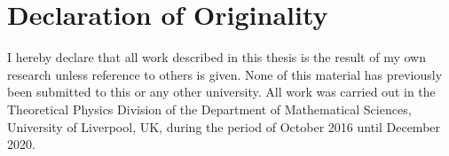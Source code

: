 
\chapter*{Declaration of Originality}
\thispagestyle{empty}

\noindent\hspace*{0.5cm}
I hereby declare that all work described in this thesis is the result of my own research unless reference to others is given. None of this material has previously been submitted to this or any other university. All work was carried out in the Theoretical Physics Division of the Department of Mathematical Sciences, University of Liverpool, UK, during the period of October 2016 until December 2020.\\